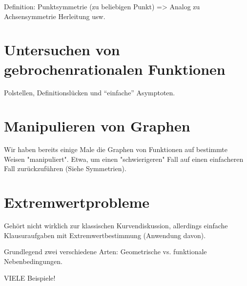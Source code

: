 Definition: Punktsymmetrie (zu beliebigen Punkt) => Analog zu Achsensymmetrie Herleitung usw. 
\begin{definition}
    
\end{definition}

\section{Untersuchen von gebrochenrationalen Funktionen}
Polstellen, Definitionslücken und "`einfache"' Asymptoten. 

\section{Manipulieren von Graphen}
Wir haben bereits einige Male die Graphen von Funktionen auf bestimmte Weisen "manipuliert". Etwa, um einen "schwierigeren" Fall auf einen einfacheren Fall zurückzuführen (Siehe Symmetrien). 

\section{Extremwertprobleme}
Gehört nicht wirklich zur klassischen Kurvendiskussion, allerdings einfache Klausuraufgaben mit Extremwertbestimmung (Anwendung davon). 

Grundlegend zwei verschiedene Arten: Geometrische vs. funktionale Nebenbedingungen. 

VIELE Beispiele!
